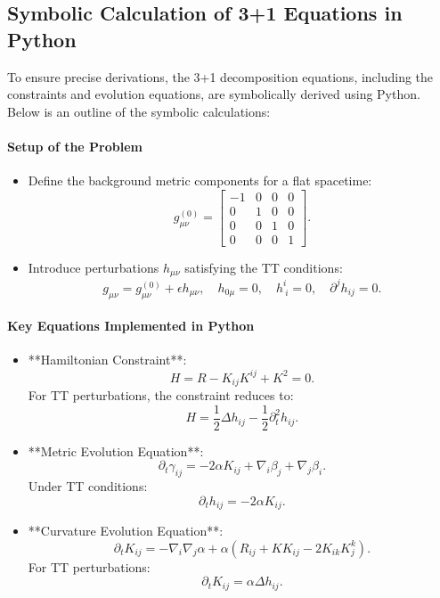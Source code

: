 \documentclass[12pt]{article}
\begin{document}
\subsection{Symbolic Calculation of 3+1 Equations in Python}

To ensure precise derivations, the 3+1 decomposition equations, including the constraints and evolution equations, are symbolically derived using Python. Below is an outline of the symbolic calculations:

\paragraph{Setup of the Problem}
\begin{itemize}
    \item Define the background metric components for a flat spacetime:
    \[
    g_{\mu\nu}^{(0)} = 
    \begin{bmatrix}
    -1 & 0 & 0 & 0 \\
    0 & 1 & 0 & 0 \\
    0 & 0 & 1 & 0 \\
    0 & 0 & 0 & 1
    \end{bmatrix}.
    \]
    \item Introduce perturbations $h_{\mu\nu}$ satisfying the TT conditions:
    \[
    g_{\mu\nu} = g_{\mu\nu}^{(0)} + \epsilon h_{\mu\nu}, \quad h_{0\mu} = 0, \quad h^i_{\ i} = 0, \quad \partial^j h_{ij} = 0.
    \]
\end{itemize}

\paragraph{Key Equations Implemented in Python}
\begin{itemize}
    \item **Hamiltonian Constraint**:
    \[
    H = R - K_{ij} K^{ij} + K^2 = 0.
    \]
    For TT perturbations, the constraint reduces to:
    \[
    H = \frac{1}{2} \Delta h_{ij} - \frac{1}{2} \partial_t^2 h_{ij}.
    \]
    \item **Metric Evolution Equation**:
    \[
    \partial_t \gamma_{ij} = -2\alpha K_{ij} + \nabla_i \beta_j + \nabla_j \beta_i.
    \]
    Under TT conditions:
    \[
    \partial_t h_{ij} = -2\alpha K_{ij}.
    \]
    \item **Curvature Evolution Equation**:
    \[
    \partial_t K_{ij} = -\nabla_i \nabla_j \alpha + \alpha \left( R_{ij} + K K_{ij} - 2K_{ik} K^k_j \right).
    \]
    For TT perturbations:
    \[
    \partial_t K_{ij} = \alpha \Delta h_{ij}.
    \]
\end{itemize}
\end{document}
